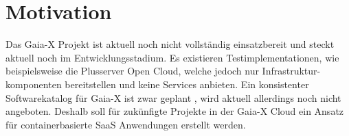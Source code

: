 \section{Motivation}
Das Gaia-X Projekt ist aktuell noch nicht vollständig einsatzbereit und steckt aktuell noch im Entwicklungsstadium.
Es existieren Testimplementationen, wie beispielsweise die Plusserver Open Cloud, welche jedoch nur Infrastruktur-
komponenten bereitstellen und keine Services anbieten. Ein konsistenter Softwarekatalog für Gaia-X ist zwar geplant \cite{BMWi2019},
wird aktuell allerdings noch nicht angeboten. Deshalb soll für zukünfigte Projekte in der Gaia-X Cloud ein Ansatz
für containerbasierte \ac{SaaS} Anwendungen erstellt werden.